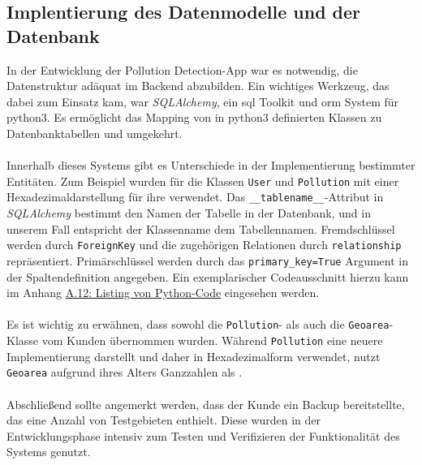 \documentclass[a4paper,12pt]{article}
\begin{document}
\subsection{Implentierung des Datenmodelle und der Datenbank}
In der Entwicklung der \glqq Pollution Detection\grqq{}-App war es notwendig, die Datenstruktur adäquat im Backend abzubilden. Ein wichtiges Werkzeug, das dabei zum Einsatz kam, war \textit{SQLAlchemy}, ein \acrshort{sql} Toolkit und \gls{orm} System für \acrshort{python3}. Es ermöglicht das Mapping von in \acrshort{python3} definierten Klassen zu Datenbanktabellen und umgekehrt.\\
\\
Innerhalb dieses Systems gibt es Unterschiede in der Implementierung bestimmter Entitäten. Zum Beispiel wurden für die Klassen \texttt{User} und \texttt{Pollution}  mit einer Hexadezimaldarstellung für ihre  verwendet. Das \texttt{\_\_tablename\_\_}-Attribut in \textit{SQLAlchemy} bestimmt den Namen der Tabelle in der Datenbank, und in unserem Fall entspricht der Klassenname dem Tabellennamen. Fremdschlüssel werden durch \texttt{ForeignKey} und die zugehörigen Relationen durch \texttt{relationship} repräsentiert. Primärschlüssel werden durch das \texttt{primary\_key=True} Argument in der Spaltendefinition angegeben. Ein exemplarischer Codeausschnitt hierzu kann im Anhang \hyperref[sec:python-code]{A.12: Listing von Python-Code} eingesehen werden.\\
\\
Es ist wichtig zu erwähnen, dass sowohl die \texttt{Pollution}- als auch die \texttt{Geoarea}-Klasse vom Kunden übernommen wurden. Während \texttt{Pollution} eine neuere Implementierung darstellt und daher  in Hexadezimalform verwendet, nutzt \texttt{Geoarea} aufgrund ihres Alters Ganzzahlen als . \\
\\
Abschließend sollte angemerkt werden, dass der Kunde ein Backup bereitstellte, das eine Anzahl von Testgebieten enthielt. Diese wurden in der Entwicklungsphase intensiv zum Testen und Verifizieren der Funktionalität des Systems genutzt.
\end{document}
